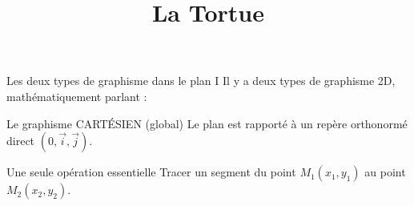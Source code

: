 \documentclass[10pt]{beamer}
\title{La Tortue}
\begin{document}
\maketitle

\begin{frame}{Les deux types de graphisme dans le plan I}
  Il y a deux types de graphisme 2D, mathématiquement parlant :
  \begin{alertblock}{Le graphisme CARTÉSIEN (global)}
    Le plan est rapporté à un repère orthonormé direct $(0,\vec{i},\vec{j})$.
  \end{alertblock}

  \begin{block}{Une seule opération essentielle}
    \alert{Tracer un segment} du point $M_1 (x_1,y_1)$ au point $M_2 (x_2, y_2)$.
  \end{block}
  \begin{center}
  \end{center}
\end{frame}
\end{document}
